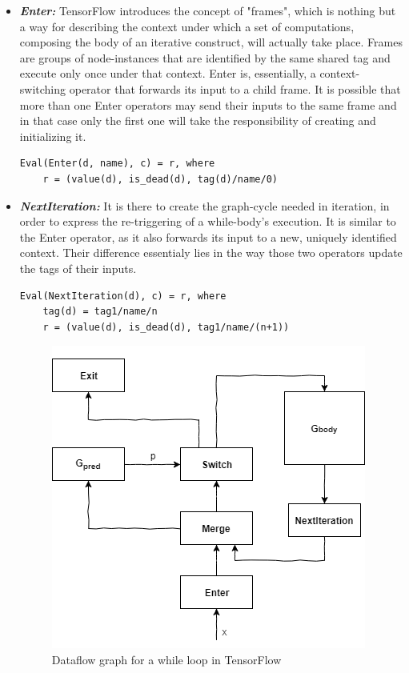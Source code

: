\documentclass[ack,preface]{dithesis}
\begin{document}
    \begin{itemize}

    \item \textit{\textbf{Enter:}} TensorFlow introduces the concept of "frames", which is nothing but a way for describing the context under which a set of computations, composing the body of an iterative construct, will actually take place. Frames are groups of node-instances that are identified by the same shared tag and execute only once under that context. Enter is, essentially, a context-switching operator that forwards its input to a child frame. It is possible that more than one Enter operators may send their inputs to the same frame and in that case only the first one will take the responsibility of creating and initializing it.
\begin{lstlisting}
Eval(Enter(d, name), c) = r, where
	r = (value(d), is_dead(d), tag(d)/name/0)
\end{lstlisting}

    \item \textit{\textbf{NextIteration:}} It is there to create the graph-cycle needed in iteration, in order to express the re-triggering of a while-body's execution. It is similar to the Enter operator, as it also forwards its input to a new, uniquely identified context. Their difference essentialy lies in the way those two operators update the tags of their inputs.
\begin{lstlisting}
Eval(NextIteration(d), c) = r, where
	tag(d) = tag1/name/n
	r = (value(d), is_dead(d), tag1/name/(n+1))
\end{lstlisting}

\begin{figure}
\centering
\includegraphics[scale=0.5]{figures/while}
\caption{ Dataflow graph for a while loop in TensorFlow}
\end{figure}


\end{itemize}
\end{document}
